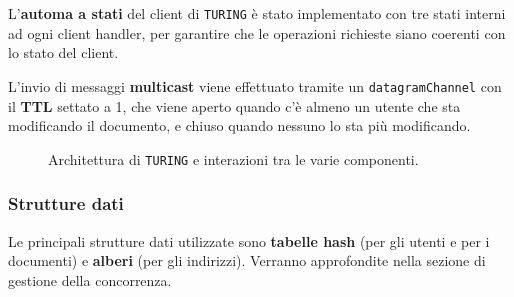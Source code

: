 L'\textbf{automa a stati} del client di \texttt{TURING} è stato implementato con tre stati interni ad ogni client handler, per garantire che le operazioni richieste siano coerenti con lo stato del client.

\medskip

L'invio di messaggi \textbf{multicast} viene effettuato tramite un \texttt{datagramChannel} con il \textbf{TTL} settato a 1, che viene aperto quando c'è almeno un utente che sta modificando il documento, e chiuso quando nessuno lo sta più modificando.

\begin{center}
	\begin{figure}[ht!]
		\caption{Architettura di \texttt{TURING} e interazioni tra le varie componenti.}
	\end{figure}
\end{center}

\newpage

\subsubsection{Strutture dati}
Le principali strutture dati utilizzate sono \textbf{tabelle hash} (per gli utenti e per i documenti) e \textbf{alberi} (per gli indirizzi). Verranno approfondite nella sezione di gestione della concorrenza.

